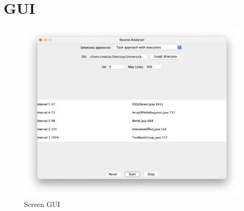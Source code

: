 \documentclass{article}
\begin{document}
    \section{GUI}
    \begin{figure}[h]
        \centering
        \includegraphics[width=1\linewidth]{screen-gui.png}
        \caption{Screen GUI}
        \label{fig:screen-gui}
    \end{figure}
\end{document}
